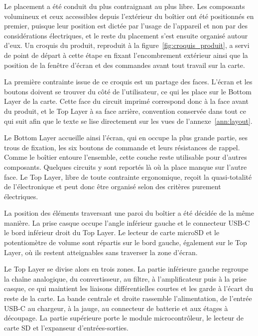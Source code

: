 Le placement a été conduit du plus contraignant au plus libre. Les composants volumineux et ceux accessibles depuis l'extérieur du boîtier ont été positionnés en premier, puisque leur position est dictée par l'usage de l'appareil et non par des considérations électriques, et le reste du placement s'est ensuite organisé autour d'eux. Un croquis du produit, reproduit à la figure~\ref{fig:croquis_produit}, a servi de point de départ à cette étape en fixant l'encombrement extérieur ainsi que la position de la fenêtre d'écran et des commandes avant tout travail sur la carte.

La première contrainte issue de ce croquis est un partage des faces. L'écran et les boutons doivent se trouver du côté de l'utilisateur, ce qui les place sur le Bottom Layer de la carte. Cette face du circuit imprimé correspond donc à la face avant du produit, et le Top Layer à sa face arrière, convention conservée dans tout ce qui suit afin que le texte se lise directement sur les vues de l'annexe~\ref{ann:layout}.

Le Bottom Layer accueille ainsi l'écran, qui en occupe la plus grande partie, ses trous de fixation, les six boutons de commande et leurs résistances de rappel. Comme le boîtier entoure l'ensemble, cette couche reste utilisable pour d'autres composants. Quelques circuits y sont reportés là où la place manque sur l'autre face. Le Top Layer, libre de toute contrainte ergonomique, reçoit la quasi-totalité de l'électronique et peut donc être organisé selon des critères purement électriques.

La position des éléments traversant une paroi du boîtier a été décidée de la même manière. La prise casque occupe l'angle inférieur gauche et le connecteur USB-C le bord inférieur droit du Top Layer. Le lecteur de carte microSD et le potentiomètre de volume sont répartis sur le bord gauche, également sur le Top Layer, où ils restent atteignables sans traverser la zone d'écran.

Le Top Layer se divise alors en trois zones. La partie inférieure gauche regroupe la chaîne analogique, du convertisseur, au filtre, à l'amplificateur puis à la prise casque, ce qui maintient les liaisons différentielles courtes et les garde à l'écart du reste de la carte. La bande centrale et droite rassemble l'alimentation, de l'entrée USB-C au chargeur, à la jauge, au connecteur de batterie et aux étages à découpage. La partie supérieure porte le module microcontrôleur, le lecteur de carte SD et l'expanseur d'entrées-sorties.

